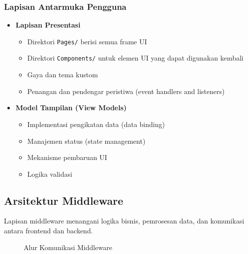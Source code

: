 \documentclass[12pt,a4paper]{article}
\begin{document}
\subsubsection{Lapisan Antarmuka Pengguna}
\begin{itemize}
    \item \textbf{Lapisan Presentasi}
    \begin{itemize}
        \item Direktori \texttt{Pages/} berisi semua frame UI
        \item Direktori \texttt{Components/} untuk elemen UI yang dapat digunakan kembali
        \item Gaya dan tema kustom
        \item Penangan dan pendengar peristiwa (event handlers and listeners)
    \end{itemize}
    
    \item \textbf{Model Tampilan (View Models)}
    \begin{itemize}
        \item Implementasi pengikatan data (data binding)
        \item Manajemen status (state management)
        \item Mekanisme pembaruan UI
        \item Logika validasi
    \end{itemize}
\end{itemize}

\subsection{Arsitektur Middleware}
Lapisan middleware menangani logika bisnis, pemrosesan data, dan komunikasi antara frontend dan backend.

\begin{figure}[h]
\centering
{}
\caption{Alur Komunikasi Middleware}
\end{figure}
\end{document}
